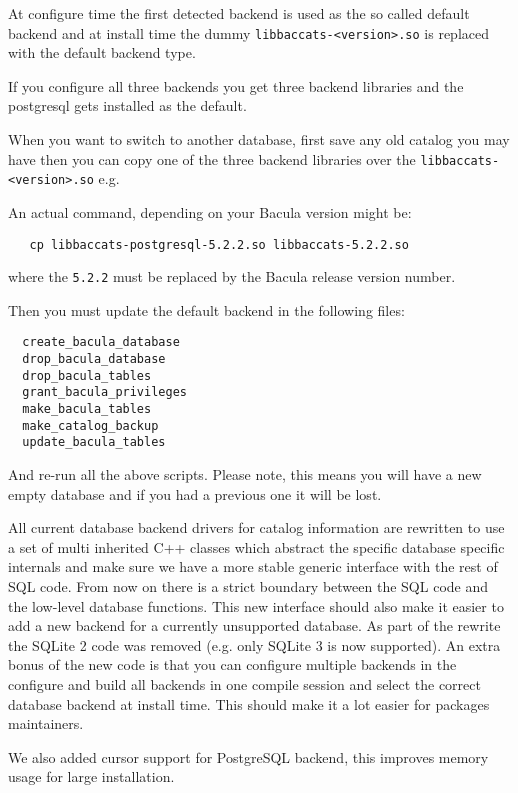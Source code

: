 At configure time the first detected backend is used as the so called
default backend and at install time the dummy
\verb+libbaccats-<version>.so+ is replaced with the default backend type.

If you configure all three backends you get three backend libraries and the
postgresql gets installed as the default.

When you want to switch to another database, first save any old catalog you
may have then you can copy one of the three backend libraries over the
\verb+libbaccats-<version>.so+ e.g.

An actual command, depending on your Bacula version might be:
\begin{verbatim}
   cp libbaccats-postgresql-5.2.2.so libbaccats-5.2.2.so
\end{verbatim}

where the \verb+5.2.2+ must be replaced by the Bacula release
version number.

Then you must update the default backend in the following files:

\begin{verbatim}
  create_bacula_database
  drop_bacula_database
  drop_bacula_tables
  grant_bacula_privileges
  make_bacula_tables
  make_catalog_backup
  update_bacula_tables
\end{verbatim}

And re-run all the above scripts.  Please note, this means
you will have a new empty database and if you had a previous
one it will be lost.

All current database backend drivers for catalog information are rewritten
to use a set of multi inherited C++ classes which abstract the specific
database specific internals and make sure we have a more stable generic
interface with the rest of SQL code.  From now on there is a strict
boundary between the SQL code and the low-level database functions.  This
new interface should also make it easier to add a new backend for a
currently unsupported database.  As part of the rewrite the SQLite 2 code
was removed (e.g.  only SQLite 3 is now supported).  An extra bonus of the
new code is that you can configure multiple backends in the configure and
build all backends in one compile session and select the correct database
backend at install time.  This should make it a lot easier for packages
maintainers.



\medskip
We also added cursor support for PostgreSQL backend, this improves memory
usage for large installation.

